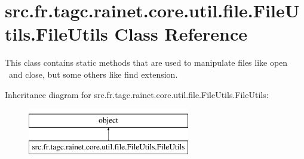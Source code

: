 \hypertarget{classsrc_1_1fr_1_1tagc_1_1rainet_1_1core_1_1util_1_1file_1_1FileUtils_1_1FileUtils}{\section{src.\-fr.\-tagc.\-rainet.\-core.\-util.\-file.\-File\-Utils.\-File\-Utils Class Reference}
\label{classsrc_1_1fr_1_1tagc_1_1rainet_1_1core_1_1util_1_1file_1_1FileUtils_1_1FileUtils}
}


This class contains static methods that are used to manipulate files like open  and close, but some others like find extension.  


Inheritance diagram for src.\-fr.\-tagc.\-rainet.\-core.\-util.\-file.\-File\-Utils.\-File\-Utils\-:\begin{figure}[H]
\begin{center}
\leavevmode
\includegraphics[height=2.000000cm]{classsrc_1_1fr_1_1tagc_1_1rainet_1_1core_1_1util_1_1file_1_1FileUtils_1_1FileUtils}
\end{center}
\end{figure}

